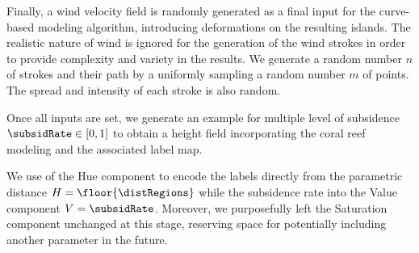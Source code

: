 
Finally, a wind velocity field is randomly generated as a final input for the curve-based modeling algorithm, introducing deformations on the resulting islands. The realistic nature of wind is ignored for the generation of the wind strokes in order to provide complexity and variety in the results. 
We generate a random number $n$ of strokes and their path by a uniformly sampling a random number $m$ of points. The spread and intensity of each stroke is also random.

Once all inputs are set, we generate an example for multiple level of subsidence $\subsidRate \in [0, 1]$ to obtain a height field incorporating the coral reef modeling and the associated label map. %


We use of the Hue component to encode the labels directly from the parametric distance $H = \floor{\distRegions}$ while the subsidence rate into the Value component $V =\subsidRate$. %
%
Moreover, we purposefully left the Saturation component unchanged at this stage, reserving space for potentially including another parameter in the future. %

